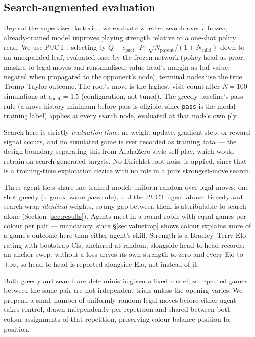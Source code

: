 \documentclass[conference,a4paper]{IEEEtran}
\begin{document}
\subsection{Search-augmented evaluation}
\label{sec:mctsmethod}
Beyond the supervised factorial, we evaluate whether search over a frozen,
already-trained model improves playing strength relative to a one-shot
policy read. We use PUCT \cite{kocsis2006bandit,silver2016mastering},
selecting by $Q + c_{\mathrm{puct}} \cdot P \cdot \sqrt{N_{\mathrm{parent}}} /
(1+N_{\mathrm{child}})$ down to an unexpanded leaf, evaluated once by the
frozen network (policy head as prior, masked to legal moves and renormalised;
value head's margin as leaf value, negated when propagated to the opponent's
node); terminal nodes use the true Tromp--Taylor outcome. The root's move is
the highest visit count after $N{=}100$ simulations at $c_{\mathrm{puct}}{=}1.5$
(configuration, not tuned). The greedy baseline's pass rule (a move-history
minimum before pass is eligible, since \texttt{pass} is the modal training
label) applies at every search node, evaluated at that node's own ply.

Search here is strictly \emph{evaluation-time}: no weight update, gradient
step, or reward signal occurs, and no simulated game is ever recorded as
training data --- the design boundary separating this from AlphaZero-style
self-play, which would retrain on search-generated targets. No Dirichlet
root noise is applied, since that is a training-time exploration device with
no role in a pure strongest-move search.

Three agent tiers share one trained model: uniform-random over legal moves;
one-shot greedy (argmax, same pass rule); and the PUCT agent above. Greedy
and search wrap \emph{identical} weights, so any gap between them is
attributable to search alone (Section~\ref{sec:results}). Agents meet in a
round-robin with equal games per colour per pair --- mandatory, since
\S\ref{sec:valuetrap} shows colour explains more of a game's outcome here
than either agent's skill. Strength is a Bradley--Terry Elo rating with
bootstrap CIs, anchored at random, alongside head-to-head records: an anchor
swept without a loss drives its own strength to zero and every Elo to
$+\infty$, so head-to-head is reported alongside Elo, not instead of it.

Both greedy and search are deterministic given a fixed model, so repeated
games between the same pair are not independent trials unless the opening
varies. We prepend a small number of uniformly random legal moves before
either agent takes control, drawn independently per repetition and shared
between both colour assignments of that repetition, preserving colour
balance position-for-position.
\end{document}
